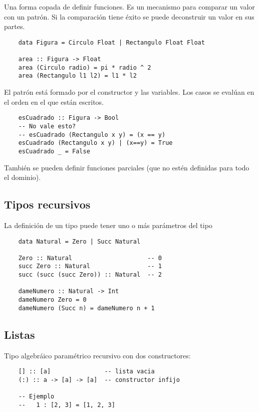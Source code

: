 \documentclass{report}
\theoremstyle{definition} %
\begin{document}
Una forma copada de definir funciones. Es un mecanismo para comparar un valor
con un patrón. Si la comparación tiene éxito se puede deconstruir un valor en
sus partes.

\begin{verbatim}
    data Figura = Circulo Float | Rectangulo Float Float

    area :: Figura -> Float
    area (Circulo radio) = pi * radio ^ 2
    area (Rectangulo l1 l2) = l1 * l2
\end{verbatim}

El patrón está formado por el constructor y las variables. Los casos se evalúan
en el orden en el que están escritos.

\begin{verbatim}
    esCuadrado :: Figura -> Bool
    -- No vale esto?
    -- esCuadrado (Rectangulo x y) = (x == y)
    esCuadrado (Rectangulo x y) | (x==y) = True
    esCuadrado _ = False
\end{verbatim}

También se pueden definir funciones parciales (que no estén definidas para todo
el dominio).

\subsection{Tipos recursivos}
La definición de un tipo puede tener uno o más parámetros del tipo

\begin{verbatim}
    data Natural = Zero | Succ Natural

    Zero :: Natural                     -- 0
    succ Zero :: Natural                -- 1
    succ (succ (succ Zero)) :: Natural  -- 2

    dameNumero :: Natural -> Int
    dameNumero Zero = 0
    dameNumero (Succ n) = dameNumero n + 1
\end{verbatim}

\subsection{Listas}

Tipo algebráico paramétrico recursivo con dos constructores:

\begin{verbatim}
    [] :: [a]               -- lista vacia
    (:) :: a -> [a] -> [a]  -- constructor infijo

    -- Ejemplo
    --   1 : [2, 3] = [1, 2, 3]
\end{verbatim}
\end{document}
